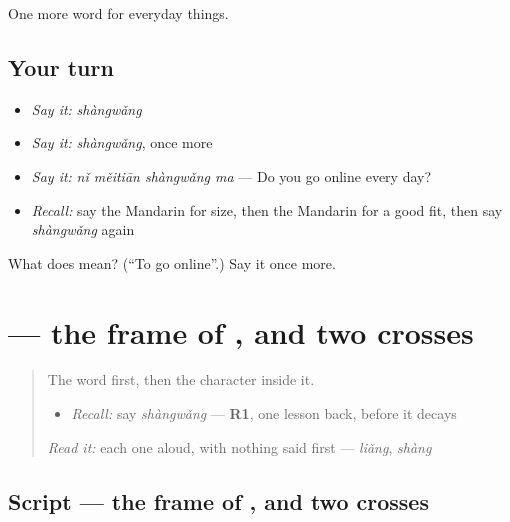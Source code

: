 \begin{grammarlens}[title={What you've built}]
One more word for everyday things.
\end{grammarlens}

\subsection*{Your turn}
\begin{itemize}
\raggedright
  \item \emph{Say it:} \emph{shàngwǎng}
  \item \emph{Say it:} \emph{shàngwǎng}, once more
  \item \emph{Say it:} \emph{nǐ měitiān shàngwǎng ma} — Do you go online every day?
  \item \emph{Recall:} say the Mandarin for size, then the Mandarin for a good fit, then say \emph{shàngwǎng} again
\end{itemize}

\begin{tcolorbox}[breakable,colback=teal!4,colframe=teal!35!black,title={Before you move on}]
What does  mean? (\textquotedblleft{}To go online\textquotedblright{}.) Say it once more.
\end{tcolorbox}
\section[\texorpdfstring{\zh{网} (wǎng)}{网 (wǎng)}]{ — the frame of , and two crosses}

\label{lesson:ZH-W109-wang-net}



\begin{quote}
The word first, then the character inside it.

\begin{itemize}
\raggedright
  \item \emph{Recall:} say \emph{shàngwǎng} — \textbf{R1}, one lesson back, before it decays
\end{itemize}

\begin{quote}
 
\end{quote}

\emph{Read it:} each one aloud, with nothing said first — \emph{liǎng}, \emph{shàng}
\end{quote}

\subsection*{Script — the frame of , and two crosses}

